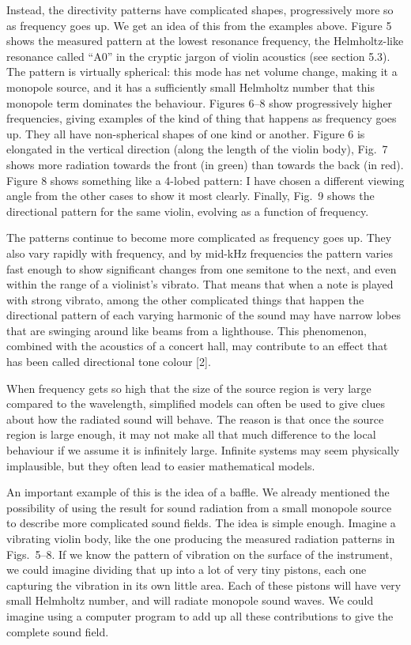   Instead, the directivity patterns have complicated shapes, progressively more 
  so as frequency goes up. We get an idea of this from the examples above. 
  Figure 5 shows the measured pattern at the lowest resonance frequency, the 
  Helmholtz-like resonance called ``A0'' in the cryptic jargon of violin 
  acoustics (see section 5.3). The pattern is virtually spherical: this mode 
  has net volume change, making it a monopole source, and it has a sufficiently 
  small Helmholtz number that this monopole term dominates the behaviour. 
  Figures 6--8 show progressively higher frequencies, giving examples of the 
  kind of thing that happens as frequency goes up. They all have non-spherical 
  shapes of one kind or another. Figure 6 is elongated in the vertical 
  direction (along the length of the violin body), Fig.\ 7 shows more radiation 
  towards the front (in green) than towards the back (in red). Figure 8 shows 
  something like a 4-lobed pattern: I have chosen a different viewing angle 
  from the other cases to show it most clearly. Finally, Fig.\ 9 shows the 
  directional pattern for the same violin, evolving as a function of frequency. 

  The patterns continue to become more complicated as frequency goes up. They 
  also vary rapidly with frequency, and by mid-kHz frequencies the pattern 
  varies fast enough to show significant changes from one semitone to the next, 
  and even within the range of a violinist's vibrato. That means that when a 
  note is played with strong vibrato, among the other complicated things that 
  happen the directional pattern of each varying harmonic of the sound may have 
  narrow lobes that are swinging around like beams from a lighthouse. This 
  phenomenon, combined with the acoustics of a concert hall, may contribute to 
  an effect that has been called directional tone colour [2]. 


  When frequency gets so high that the size of the source region is very large 
  compared to the wavelength, simplified models can often be used to give clues 
  about how the radiated sound will behave. The reason is that once the source 
  region is large enough, it may not make all that much difference to the local 
  behaviour if we assume it is infinitely large. Infinite systems may seem 
  physically implausible, but they often lead to easier mathematical models. 

  An important example of this is the idea of a baffle. We already mentioned 
  the possibility of using the result for sound radiation from a small monopole 
  source to describe more complicated sound fields. The idea is simple enough. 
  Imagine a vibrating violin body, like the one producing the measured 
  radiation patterns in Figs.\ 5--8. If we know the pattern of vibration on the 
  surface of the instrument, we could imagine dividing that up into a lot of 
  very tiny pistons, each one capturing the vibration in its own little area. 
  Each of these pistons will have very small Helmholtz number, and will radiate 
  monopole sound waves. We could imagine using a computer program to add up all 
  these contributions to give the complete sound field. 

